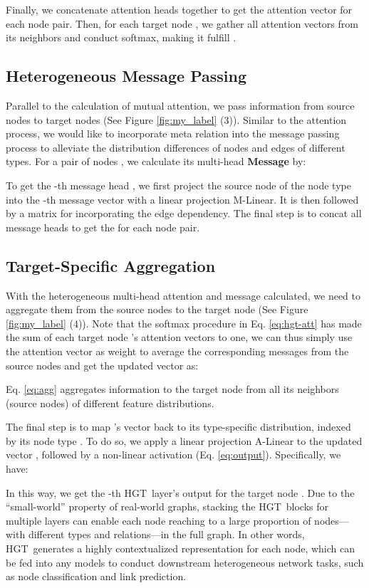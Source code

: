 \documentclass[sigconf]{acmart}
\theoremstyle{definition}
\newcommand{\short}{HGT}
\begin{document}
{Finally, we concatenate  attention heads together to get the attention vector for each node pair. 
Then, for each target node , we gather all attention vectors from its neighbors  and conduct softmax, making it fulfill .



\subsection{Heterogeneous Message Passing}
Parallel to the calculation of mutual attention, we pass information from source nodes to target nodes (See Figure \ref{fig:my_label} (3)). 
Similar to the attention process, we would like to incorporate meta relation into the message passing process to alleviate the distribution differences of nodes and edges of different types. For a pair of nodes , we calculate its multi-head \textbf{Message} by:

To get the -th message head , we first project the source node  of the node type  into the -th message vector with a linear projection M-Linear. 
It is then followed by a matrix  for incorporating the edge dependency. 
The final step is to concat all  message heads to get the   for each node pair.


\subsection{Target-Specific Aggregation}
With the heterogeneous multi-head attention and message calculated, we need to aggregate them from the source nodes to the target node (See Figure \ref{fig:my_label} (4)). 
Note that the softmax procedure in Eq. \ref{eq:hgt-att} has made the sum of each target node 's attention vectors to one, we can thus simply use the attention vector as weight to average the corresponding messages from the source nodes and get the updated vector  as:


Eq. \ref{eq:agg} aggregates information to the target node  from all its neighbors (source nodes) of different feature distributions. 

The final step is to map 's vector back to its type-specific distribution, indexed by its node type . 
To do so, we apply a linear projection A-Linear to the updated vector , followed by a non-linear activation (Eq. \ref{eq:output}). Specifically, we have: 




In this way, we get the -th \short\ layer's output  for the target node . 
Due to the ``small-world'' property of real-world graphs, stacking the \short\ blocks for multiple layers can enable each node reaching to a large proportion of nodes---with different types and relations---in the full graph. 
In other words, \short\ generates a highly contextualized representation  for each node, which can be fed into any models to conduct downstream heterogeneous network tasks, such as node classification and link prediction. 

}
\end{document}

